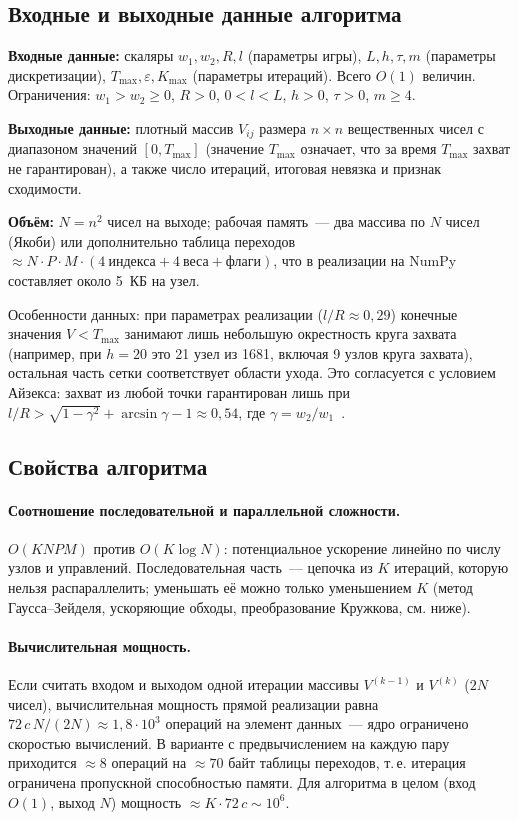 \documentclass[14pt,a4paper]{extarticle}
\newcommand{\Tmax}{T_{\max}}
\begin{document}
\subsection{Входные и выходные данные алгоритма}

\textbf{Входные данные:} скаляры $w_1,w_2,R,l$ (параметры игры), $L,h,\tau,m$
(параметры дискретизации), $\Tmax,\varepsilon,K_{\max}$ (параметры
итераций). Всего $O(1)$ величин. Ограничения:
$w_1>w_2\ge 0$, $R>0$, $0<l<L$, $h>0$, $\tau>0$, $m\ge 4$.

\textbf{Выходные данные:} плотный массив $V_{ij}$ размера $n\times n$
вещественных чисел с диапазоном значений $[0,\Tmax]$ (значение $\Tmax$
означает, что за время $\Tmax$ захват не гарантирован), а также число
итераций, итоговая невязка и признак сходимости.

\textbf{Объём:} $N=n^2$ чисел на выходе; рабочая память~--- два массива
по $N$ чисел (Якоби) или дополнительно таблица переходов
$\approx N\cdot P\cdot M\cdot(4~\text{индекса}+4~\text{веса}+\text{флаги})$,
что в реализации на NumPy составляет около 5~КБ на узел.

Особенности данных: при параметрах реализации ($l/R\approx 0{,}29$)
конечные значения $V<\Tmax$ занимают лишь небольшую окрестность круга
захвата (например, при $h=20$ это 21 узел из 1681, включая 9 узлов круга захвата), остальная часть сетки
соответствует области ухода. Это согласуется с условием Айзекса: захват
из любой точки гарантирован лишь при
$l/R>\sqrt{1-\gamma^2}+\arcsin\gamma-1\approx 0{,}54$, где
$\gamma=w_2/w_1$~\cite{isaacs}.

\subsection{Свойства алгоритма}

\paragraph{Соотношение последовательной и параллельной сложности.}
$O(K N P M)$ против $O(K\log N)$: потенциальное ускорение линейно по
числу узлов и управлений. Последовательная часть~--- цепочка из $K$
итераций, которую нельзя распараллелить; уменьшать её можно только
уменьшением $K$ (метод Гаусса--Зейделя, ускоряющие обходы,
преобразование Кружкова, см. ниже).

\paragraph{Вычислительная мощность.}
Если считать входом и выходом одной итерации массивы $V^{(k-1)}$ и
$V^{(k)}$ ($2N$ чисел), вычислительная мощность прямой реализации равна
$72\,c\,N/(2N)\approx 1{,}8\cdot 10^{3}$ операций на элемент данных~---
ядро ограничено скоростью вычислений. В варианте с предвычислением на
каждую пару приходится $\approx 8$ операций на $\approx 70$ байт таблицы
переходов, т.\,е. итерация ограничена пропускной способностью памяти.
Для алгоритма в целом (вход $O(1)$, выход $N$) мощность
$\approx K\cdot 72\,c\sim 10^{6}$.
\end{document}
